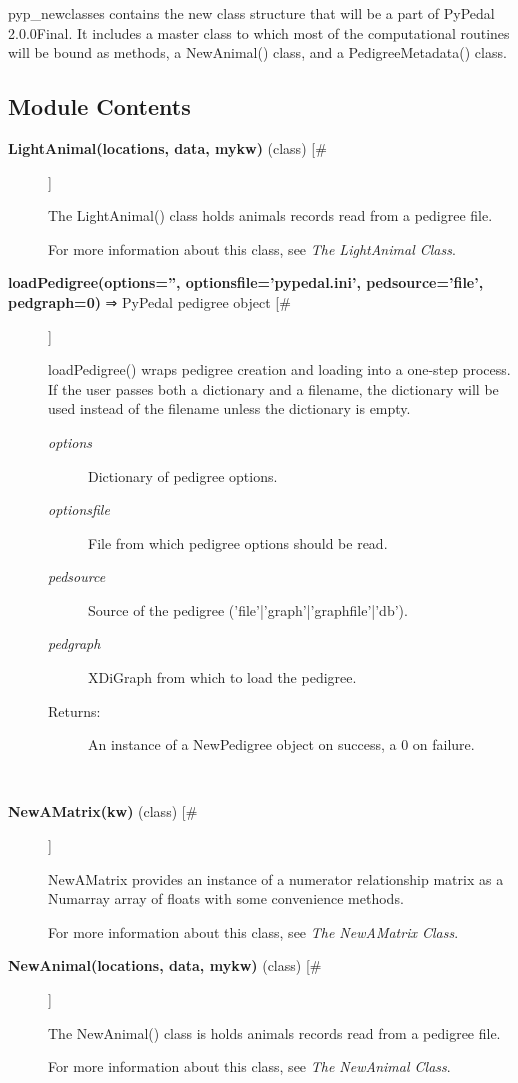 \par pyp\_newclasses contains the new class structure that will be a part of PyPedal 2.0.0Final.
It includes a master class to which most of the computational routines will be bound as
methods, a NewAnimal() class, and a PedigreeMetadata() class.
\subsection*{Module Contents}
\begin{description}
\item[\textbf{LightAnimal(locations, data, mykw)} (class) [\#]
]
\par The LightAnimal() class holds animals records read from a pedigree file.
\par For more information about this class, see \textit{The LightAnimal Class}.

\item[\textbf{loadPedigree(options='', optionsfile='pypedal.ini', pedsource='file', pedgraph=0)} ⇒ PyPedal pedigree object [\#]
]
\par loadPedigree() wraps pedigree creation and loading into a one-step
process.  If the user passes both a dictionary and a filename, the
dictionary will be used instead of the filename unless the dictionary
is empty.
\begin{description}
\item[\textit{options}
]
Dictionary of pedigree options.
\item[\textit{optionsfile}
]
File from which pedigree options should be read.
\item[\textit{pedsource}
]
Source of the pedigree ('file'|'graph'|'graphfile'|'db').
\item[\textit{pedgraph}
]
XDiGraph from which to load the pedigree.
\item[Returns:
]
An instance of a NewPedigree object on success, a 0 on failure.
\end{description}\\

\item[\textbf{NewAMatrix(kw)} (class) [\#]
]
\par NewAMatrix provides an instance of a numerator relationship matrix as a Numarray array of
floats with some convenience methods.
\par For more information about this class, see \textit{The NewAMatrix Class}.

\item[\textbf{NewAnimal(locations, data, mykw)} (class) [\#]
]
\par The NewAnimal() class is holds animals records read from a pedigree file.
\par For more information about this class, see \textit{The NewAnimal Class}.


\end{description}
